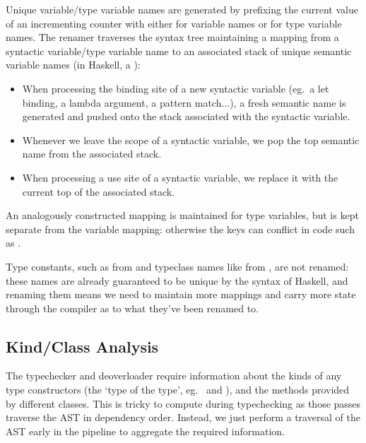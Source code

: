 \documentclass[dissertation.tex]{subfiles}
\begin{document}
{{{            Unique variable/type variable names are generated by prefixing the current value of an incrementing counter
            with either  for variable names or  for type variable names. The renamer traverses
            the syntax tree maintaining a mapping from a syntactic variable/type variable name to an associated stack of
            unique semantic variable names (in Haskell, a ):

            \begin{itemize}
            \item When processing the binding site of a new syntactic variable (eg.\ a let binding, a lambda argument, a
            pattern match...), a fresh semantic name is generated and pushed onto the stack associated with the
            syntactic variable.
            \item Whenever we leave the scope of a syntactic variable, we pop the top semantic name from the associated
            stack.
            \item When processing a use site of a syntactic variable, we replace it with the current top of the
            associated stack.
            \end{itemize}

            An analogously constructed mapping is maintained for type variables, but is kept separate from the variable
            mapping: otherwise the keys can conflict in code such as .

            Type constants, such as  from  and typeclass names like
             from , are not renamed: these names are already guaranteed to
            be unique by the syntax of Haskell, and renaming them means we need to maintain more mappings and carry more
            state through the compiler as to what they've been renamed to.

        }
        \subsection{Kind/Class Analysis}
        {

            The typechecker and deoverloader require information about the kinds of any type constructors (the `type of
            the type', eg.\  and ), and the methods provided by different
            classes. This is tricky to compute during typechecking as those passes traverse the AST in dependency order.
            Instead, we just perform a traversal of the AST early in the pipeline to aggregate the required information.

}}}
\end{document}
